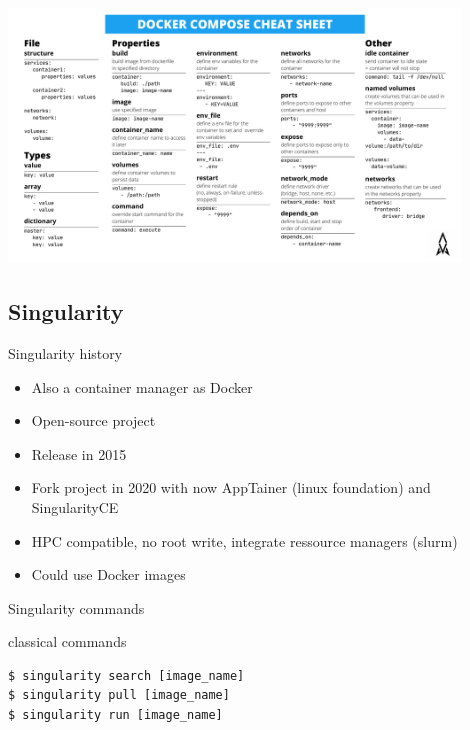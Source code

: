 \begin{frame}
\centering\includegraphics[width=0.9\textwidth]{images/docker-compose-cheat-sheet.pdf}
\end{frame}

\subsection{Singularity}
\begin{frame}[<+->]{Singularity history}
\begin{itemize}
\item Also a container manager as Docker
\item Open-source project
\item Release in 2015
\item Fork project in 2020 with now AppTainer (linux foundation) and SingularityCE
\item HPC compatible, no root write, integrate ressource managers (slurm)
\item Could use Docker images
\end{itemize}
\end{frame}

\begin{frame}[<+->][fragile]{Singularity commands}
\begin{block}{classical commands}
\begin{verbatim}
$ singularity search [image_name]
$ singularity pull [image_name]
$ singularity run [image_name]
\end{verbatim}
\end{block}
\end{frame}

